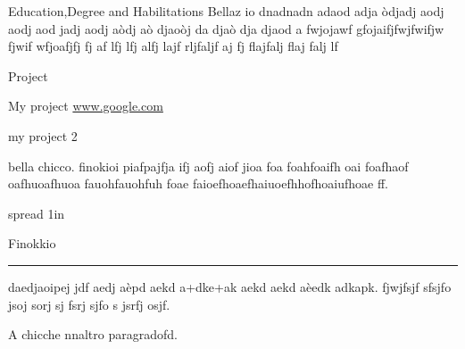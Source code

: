 \documentclass[a4paper,11pt]{dmCV}
\begin{document}
\address{Via Prenestina 226}
\personaldata
\begin{eventlist}{Education,Degree and Habilitations}
  Bellaz io dnadnadn adaod adja òdjadj aodj aodj aod
   jadj aodj aòdj aò djaoòj da djaò dja djaod a
  fwjojawf gfojaifjfwjfwifjw fjwif wfjoafjfj fj af
    lfj lfj alfj lajf rljfaljf aj fj flajfalj flaj falj lf
\end{eventlist}

\begin{eventlist}{Project}
  \item My project \url{www.google.com}
  \item my project 2
\end{eventlist}

 bella chicco. finokioi piafpajfja ifj aofj aiof jioa foa foahfoaifh
 oai foafhaof oafhuoafhuoa fauohfauohfuh foae
 faioefhoaefhaiuoefhhofhoaiufhoae ff.\par
\hbox spread 1in{Finokkio  \leaders\hrule  height1.5pt\hfil}
daedjaoipej jdf aedj aèpd aekd a+dke+ak aekd aekd aèedk
adkapk. fjwjfsjf sfsjfo jsoj sorj sj fsrj sjfo s jsrfj osjf.

A chicche nnaltro paragradofd.
\end{document}
